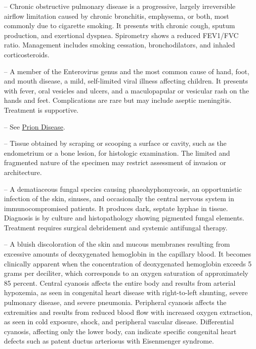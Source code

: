 -- Chronic obstructive pulmonary disease is a progressive, largely irreversible airflow limitation caused by chronic bronchitis, emphysema, or both, most commonly due to cigarette smoking. It presents with chronic cough, sputum production, and exertional dyspnea. Spirometry shows a reduced FEV1/FVC ratio. Management includes smoking cessation, bronchodilators, and inhaled corticosteroids.

-- A member of the Enterovirus genus and the most common cause of hand, foot, and mouth disease, a mild, self-limited viral illness affecting children. It presents with fever, oral vesicles and ulcers, and a maculopapular or vesicular rash on the hands and feet. Complications are rare but may include aseptic meningitis. Treatment is supportive.

-- See \hyperlink{Prion Disease}{Prion Disease}.

-- Tissue obtained by scraping or scooping a surface or cavity, such as the endometrium or a bone lesion, for histologic examination. The limited and fragmented nature of the specimen may restrict assessment of invasion or architecture.

-- A dematiaceous fungal species causing phaeohyphomycosis, an opportunistic infection of the skin, sinuses, and occasionally the central nervous system in immunocompromised patients. It produces dark, septate hyphae in tissue. Diagnosis is by culture and histopathology showing pigmented fungal elements. Treatment requires surgical debridement and systemic antifungal therapy.

-- A bluish discoloration of the skin and mucous membranes resulting from excessive amounts of deoxygenated hemoglobin in the capillary blood. It becomes clinically apparent when the concentration of deoxygenated hemoglobin exceeds 5 grams per deciliter, which corresponds to an oxygen saturation of approximately 85 percent. Central cyanosis affects the entire body and results from arterial hypoxemia, as seen in congenital heart disease with right-to-left shunting, severe pulmonary disease, and severe pneumonia. Peripheral cyanosis affects the extremities and results from reduced blood flow with increased oxygen extraction, as seen in cold exposure, shock, and peripheral vascular disease. Differential cyanosis, affecting only the lower body, can indicate specific congenital heart defects such as patent ductus arteriosus with Eisenmenger syndrome.

